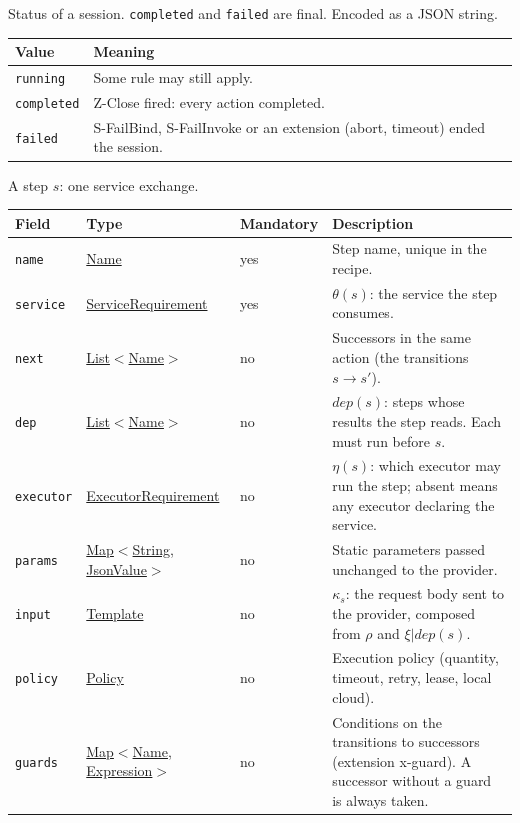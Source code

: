 \documentclass[a4paper]{arrowhead}
\newcommand{\mref}[1]{{\textcolor{ArrowheadPurple}{\hyperref[sec:model:#1]{#1}}}}
\newcommand{\pref}[1]{{\textcolor{ArrowheadGrey}{\hyperref[sec:model:primitives:#1]{#1}}}}
\begin{document}
Status of a session. \texttt{completed} and \texttt{failed} are final.
 Encoded as a JSON string.
{\small
\begin{longtable}{|p{3.9cm}|p{11.9cm}|}

\hline
\rowcolor{gray!33} Value & Meaning \\ \hline
\endhead
\texttt{running} & Some rule may still apply. \\ \hline
\texttt{completed} & Z-Close fired: every action completed. \\ \hline
\texttt{failed} & S-FailBind, S-FailInvoke or an extension (abort, timeout) ended the session. \\ \hline
\end{longtable}
}

A step $s$: one service exchange.

{\small
\begin{longtable}{|p{3.7cm}|p{4.2cm}|p{1.6cm}|p{6.3cm}|}

\hline
\rowcolor{gray!33} Field & Type & Mandatory & Description \\ \hline
\endhead
\texttt{name} & \pref{Name} & yes & Step name, unique in the recipe. \\ \hline
\texttt{service} & \mref{ServiceRequirement} & yes & $\theta(s)$: the service the step consumes. \\ \hline
\texttt{next} & \pref{List}$<$\pref{Name}$>$ & no & Successors in the same action (the transitions $s \rightarrow s'$). \\ \hline
\texttt{dep} & \pref{List}$<$\pref{Name}$>$ & no & $dep(s)$: steps whose results the step reads. Each must run before $s$. \\ \hline
\texttt{executor} & \mref{ExecutorRequirement} & no & $\eta(s)$: which executor may run the step; absent means any executor declaring the service. \\ \hline
\texttt{params} & \pref{Map}$<$\pref{String}, \pref{JsonValue}$>$ & no & Static parameters passed unchanged to the provider. \\ \hline
\texttt{input} & \pref{Template} & no & $\kappa_s$: the request body sent to the provider, composed from $\rho$ and $\xi|dep(s)$. \\ \hline
\texttt{policy} & \mref{Policy} & no & Execution policy (quantity, timeout, retry, lease, local cloud). \\ \hline
\texttt{guards} & \pref{Map}$<$\pref{Name}, \pref{Expression}$>$ & no & Conditions on the transitions to successors (extension x-guard). A successor without a guard is always taken. \\ \hline
\end{longtable}
}
\end{document}
